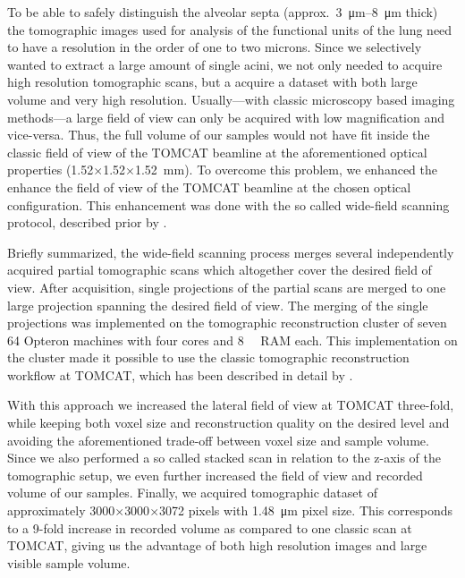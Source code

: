 \documentclass[%
	draft=true,
	paper=a4,%
	twoside=true,%
	abstract=true]{scrartcl}
\newcommand{\todojcs}[2][]{\todo[color=magenta!62!white, #1]{Johannes: #2}}
\begin{document}
To be able to safely distinguish the alveolar septa (approx.~\SIrange{3}{8}{\micro\meter} thick\todojcs{Correct?}) the tomographic images used for analysis of the functional units of the lung need to have a resolution in the order of one to two microns. Since we selectively wanted to extract a large amount of single acini, we not only needed to acquire high resolution tomographic scans, but a acquire a dataset with both large volume and very high resolution. Usually---with classic microscopy based imaging methods---a large field of view can only be acquired with low magnification and vice-versa. Thus, the full volume of our samples would not have fit inside the classic field of view of the TOMCAT beamline at the aforementioned optical properties (1.52\(\times\)1.52\(\times\)\SI{1.52}{\milli\meter}). To overcome this problem, we enhanced the enhance the field of view of the TOMCAT beamline at the chosen optical configuration. This enhancement was done with the so called wide-field scanning protocol, described prior by \citet{Haberthuer2010}.

Briefly summarized, the wide-field scanning process merges several independently acquired partial tomographic scans which altogether cover the desired field of view. After acquisition, single projections of the partial scans are merged to one large projection spanning the desired field of view. The merging of the single projections was implemented on the tomographic reconstruction cluster of seven \SI{64}{\bit} Opteron machines with four cores and \SI{8}{\giga\byte} RAM each. This implementation on the cluster made it possible to use the classic tomographic reconstruction workflow at TOMCAT, which has been described in detail by \citet{Hintermueller2010}.

With this approach we increased the lateral field of view at TOMCAT three-fold, while keeping both voxel size and reconstruction quality on the desired level and avoiding the aforementioned trade-off between voxel size and sample volume. Since we also performed a so called stacked scan in relation to the z-axis of the tomographic setup, we even further increased the field of view and recorded volume of our samples. Finally, we acquired tomographic dataset of approximately 3000\(\times\)3000\(\times\)3072 pixels with \SI{1.48}{\micro\meter} pixel size. This corresponds to a 9-fold increase in recorded volume as compared to one classic scan at TOMCAT, giving us the advantage of both high resolution images and large visible sample volume.
\end{document}
